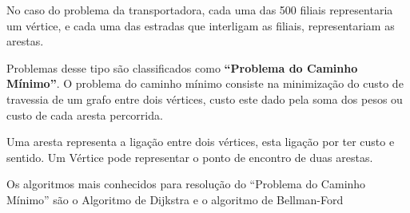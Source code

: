 \documentclass[a4paper,10pt]{article}
\begin{document}
{No caso do problema da transportadora, cada uma das 500 filiais representaria um vértice, e cada uma das estradas que interligam as filiais, representariam as arestas. 

Problemas desse tipo são classificados como  \textbf{``Problema do Caminho Mínimo''}.
O problema do caminho mínimo consiste na minimização do custo de travessia de um grafo entre dois vértices, custo este dado pela soma dos pesos ou custo de cada aresta percorrida.

Uma aresta representa a ligação entre dois vértices, esta ligação por ter custo e sentido.
Um Vértice pode representar o ponto de encontro de duas arestas.%

Os algoritmos mais conhecidos para resolução do ``Problema do Caminho Mínimo'' são o Algoritmo de Dijkstra\cite{4} e o algoritmo de Bellman-Ford\cite{5}

}
\end{document}
